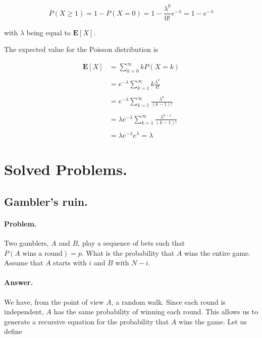 \documentclass[12pt]{article}
\begin{document}
\begin{equation}
P(X \geq 1) = 1 - P(X = 0) = 1 - \frac{\lambda^{0}}{0!} e^{-\lambda} = 
1 - e^{-\lambda}
\end{equation}

\noindent
with $\lambda$ being equal to $\mathbf{E}[X]$.

The expected value for the Poisson distribution is 

\begin{align}
\mathbf{E} [ X ] &= \sum_{k=0}^{\infty} k P(X = k)
\nonumber \\
\nonumber \\
&= e^{-\lambda} \sum_{k = 1}^{\infty} k \frac{\lambda^{k}}{k!}
\nonumber \\
\nonumber \\
&= e^{-\lambda} \sum_{k = 1}^{\infty} \frac{\lambda^{k}}{(k - 1)!}
\nonumber \\
\nonumber \\
&= \lambda e^{-\lambda} \sum_{k = 1}^{\infty} \frac{\lambda^{k-1}}{(k - 1)!}
\nonumber \\
\nonumber \\
&= \lambda e^{-\lambda} e^{\lambda} = \lambda
\end{align}

\section{Solved Problems.}

\subsection{Gambler's ruin.}

\paragraph{Problem.}
Two gamblers, $A$ and $B$, play a sequence of bets such that
$P(A\text{ wins a round}) = p$. 
What is the probability that $A$ wins the entire game.
Assume that $A$ starts with $i$ and $B$ with $N-i$.

\paragraph{Answer.}
We have, from the point of view $A$, a random walk.
Since each round is independent, $A$ has the same probability of winning each round.
This allows us to generate a recursive equation for the 
probability that $A$ wins the game.
Let us define
\end{document}
